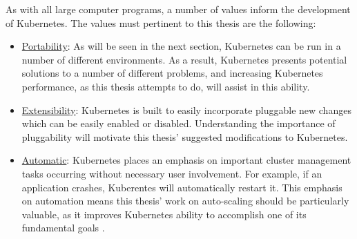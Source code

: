 As with all large computer programs, a number of values inform the development of
Kubernetes. The values must pertinent to this thesis are the following:

\begin{itemize}
  \item \underline{Portability}: As will be seen in the next section,
    Kubernetes can be run in a number of different environments. As a result,
    Kubernetes presents potential solutions to a number of different problems, and
    increasing Kubernetes performance, as this thesis attempts to do, will assist in
    this ability.
  \item \underline{Extensibility}: Kubernetes is built to
    easily incorporate pluggable new changes which can be easily enabled or
    disabled. Understanding the importance of pluggability will motivate this
    thesis' suggested modifications to Kubernetes.
  \item \underline{Automatic}: Kubernetes places an emphasis on important
    cluster management tasks occurring without necessary user involvement. For
    example, if an application crashes, Kuberentes will automatically restart
    it. This emphasis on automation means this thesis' work on auto-scaling
    should be particularly valuable, as it improves Kubernetes ability to
    accomplish one of its fundamental goals \cite{what-is-k8s}.
\end{itemize}
